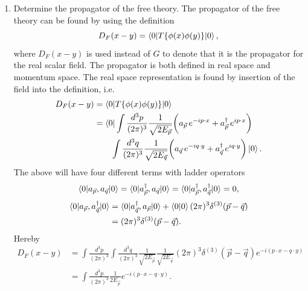 \begin{enumerate}
	\item Determine the propagator of the free theory. The propagator of the free theory can be found by using the definition
	\begin{equation}
		D_F(x-y)=\braket{0|T\{\phi(x)\phi(y)\}|0},
	\end{equation} 
	where $D_F(x-y)$ is used instead of $G$ to denote that it is the propagator for the real scalar field. The propagator is both defined in real space and momentum space. The real space representation is found by insertion of the field into the definition,  i.e.
	 \begin{equation}
		\begin{split}
			D_F(x-y)&=\braket{0|T\{\phi(x)\phi(y)\}|0}\\
			&=\bra{0}\int \frac{d^3 p}{(2\pi)^3}\frac{1}{\sqrt{2E_{\vec{p}}}}\bigg(a_{\vec{p}}\,e^{-ip\cdot x}+a_{\vec{p}}^\dagger\,e^{ip\cdot x}\bigg)\\
				&\qquad\int \frac{d^3 q}{(2\pi)^3}\frac{1}{\sqrt{2E_{\vec{q}}}}\bigg(a_{\vec{q}}\,e^{-iq\cdot y}+a_{\vec{q}}^\dagger\,e^{iq\cdot y}\bigg)\ket{0}.\\
		\end{split}
	\end{equation} 
	The above will have four different terms with ladder operators
	\begin{equation}
		\braket{0|a_{\vec{p}},a_{\vec{q}}|0}=\braket{0|a_{\vec{p}}^\dagger,a_{\vec{q}}|0}=\braket{0|a_{\vec{p}}^\dagger,a_{\vec{q}}^\dagger|0}=0,
	\end{equation} 
	\begin{equation}
		\begin{split}
			\braket{0|a_{\vec{p}},a_{\vec{q}}^\dagger|0}&=\braket{0|a_{\vec{q}}^\dagger,a_{\vec{p}}|0}+\braket{0|0}(2\pi)^3\delta^{(3)}(\vec{p}-\vec{q})\\
			&=(2\pi)^3\delta^{(3)}(\vec{p}-\vec{q}).
		\end{split}
	\end{equation} 
	Hereby
	\begin{equation}
		\begin{split}
			D_F(x-y)&=\int \frac{d^3 p}{(2\pi)^3}\int \frac{d^3 q}{(2\pi)^3}\frac{1}{\sqrt{2E_{\vec{p}}}}\frac{1}{\sqrt{2E_{\vec{q}}}}(2\pi)^3\delta^{(3)}(\vec{p}-\vec{q})e^{-i(p\cdot x-q\cdot y)}\\
			&=\int \frac{d^3 p}{(2\pi)^3}\frac{1}{2E_{\vec{p}}}e^{-i(p\cdot x-q\cdot y)}.
			\label{prop1}
		\end{split}
	\end{equation} 

\end{enumerate}
